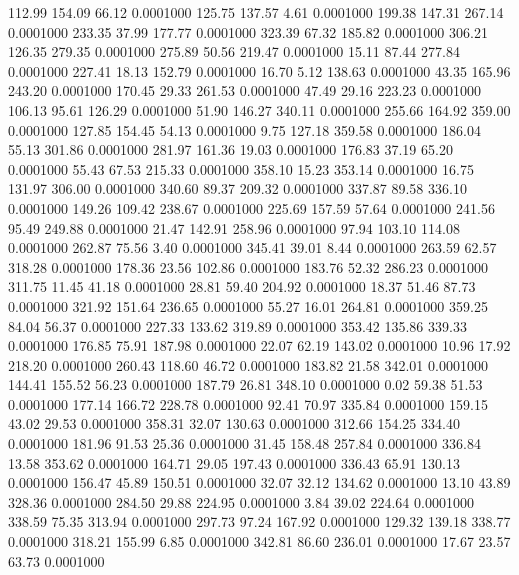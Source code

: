  112.99  154.09   66.12   0.0001000
 125.75  137.57    4.61   0.0001000
 199.38  147.31  267.14   0.0001000
 233.35   37.99  177.77   0.0001000
 323.39   67.32  185.82   0.0001000
 306.21  126.35  279.35   0.0001000
 275.89   50.56  219.47   0.0001000
  15.11   87.44  277.84   0.0001000
 227.41   18.13  152.79   0.0001000
  16.70    5.12  138.63   0.0001000
  43.35  165.96  243.20   0.0001000
 170.45   29.33  261.53   0.0001000
  47.49   29.16  223.23   0.0001000
 106.13   95.61  126.29   0.0001000
  51.90  146.27  340.11   0.0001000
 255.66  164.92  359.00   0.0001000
 127.85  154.45   54.13   0.0001000
   9.75  127.18  359.58   0.0001000
 186.04   55.13  301.86   0.0001000
 281.97  161.36   19.03   0.0001000
 176.83   37.19   65.20   0.0001000
  55.43   67.53  215.33   0.0001000
 358.10   15.23  353.14   0.0001000
  16.75  131.97  306.00   0.0001000
 340.60   89.37  209.32   0.0001000
 337.87   89.58  336.10   0.0001000
 149.26  109.42  238.67   0.0001000
 225.69  157.59   57.64   0.0001000
 241.56   95.49  249.88   0.0001000
  21.47  142.91  258.96   0.0001000
  97.94  103.10  114.08   0.0001000
 262.87   75.56    3.40   0.0001000
 345.41   39.01    8.44   0.0001000
 263.59   62.57  318.28   0.0001000
 178.36   23.56  102.86   0.0001000
 183.76   52.32  286.23   0.0001000
 311.75   11.45   41.18   0.0001000
  28.81   59.40  204.92   0.0001000
  18.37   51.46   87.73   0.0001000
 321.92  151.64  236.65   0.0001000
  55.27   16.01  264.81   0.0001000
 359.25   84.04   56.37   0.0001000
 227.33  133.62  319.89   0.0001000
 353.42  135.86  339.33   0.0001000
 176.85   75.91  187.98   0.0001000
  22.07   62.19  143.02   0.0001000
  10.96   17.92  218.20   0.0001000
 260.43  118.60   46.72   0.0001000
 183.82   21.58  342.01   0.0001000
 144.41  155.52   56.23   0.0001000
 187.79   26.81  348.10   0.0001000
   0.02   59.38   51.53   0.0001000
 177.14  166.72  228.78   0.0001000
  92.41   70.97  335.84   0.0001000
 159.15   43.02   29.53   0.0001000
 358.31   32.07  130.63   0.0001000
 312.66  154.25  334.40   0.0001000
 181.96   91.53   25.36   0.0001000
  31.45  158.48  257.84   0.0001000
 336.84   13.58  353.62   0.0001000
 164.71   29.05  197.43   0.0001000
 336.43   65.91  130.13   0.0001000
 156.47   45.89  150.51   0.0001000
  32.07   32.12  134.62   0.0001000
  13.10   43.89  328.36   0.0001000
 284.50   29.88  224.95   0.0001000
   3.84   39.02  224.64   0.0001000
 338.59   75.35  313.94   0.0001000
 297.73   97.24  167.92   0.0001000
 129.32  139.18  338.77   0.0001000
 318.21  155.99    6.85   0.0001000
 342.81   86.60  236.01   0.0001000
  17.67   23.57   63.73   0.0001000
